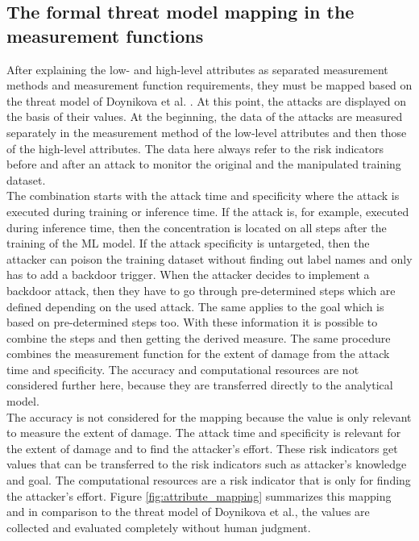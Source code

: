 \subsection{The formal threat model mapping in the measurement functions}
\label{sec:map_low_high}

After explaining the low- and high-level attributes as separated measurement methods and measurement function requirements, they must be mapped based on the threat model of Doynikova et al. \cite{DBLP:conf/crisis/DoynikovaNGK20}. At this
point, the attacks are displayed on the basis of their values. At the beginning, the data of the attacks are measured separately in the measurement method of the low-level attributes and then those of
the high-level attributes. The data here always refer to the risk indicators before and after an attack to monitor the original and the manipulated training dataset. \\
The combination starts with the attack time and specificity where the attack is executed during training or inference time. If the attack is, for example, executed during inference time, then the concentration is located on all steps after the training of the ML model. If the attack specificity is untargeted, then the attacker can poison the training dataset without finding out label names and only has to add a backdoor trigger. When the attacker decides to implement a backdoor attack, then they have to go through pre-determined steps which are defined depending on the used attack. The same applies to the goal which is based on pre-determined steps too. With these information it is possible to combine the steps and then getting the derived measure. The same procedure combines the measurement function for the extent of damage from the attack time and specificity. The accuracy and computational resources are not considered further here, because they are transferred directly to the analytical model. \\
The accuracy is not considered for the mapping because the value is only relevant to measure the extent of damage. The attack time and specificity is relevant for the extent of damage and to find the attacker's effort. These risk indicators get values that can be transferred to the risk indicators such as attacker's
knowledge and goal. The computational resources are a risk indicator that is only for finding the attacker's effort. Figure \ref{fig:attribute_mapping} summarizes this mapping and in comparison to
the threat model of Doynikova et al., the values are collected and evaluated completely without human judgment.

